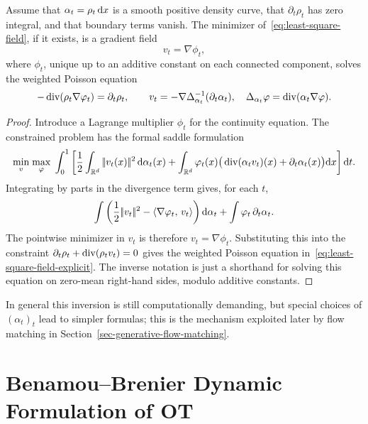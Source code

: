 \begin{prop}\label{prop-least-square-gradient-velocity}
	Assume that $\alpha_t=\rho_t\,\mathrm{d} x$ is a smooth positive density curve, that $\partial_t\rho_t$ has zero integral, and that boundary terms vanish. The minimizer of~\eqref{eq:least-square-field}, if it exists, is a gradient field
	\[
		v_t=\nabla\phi_t,
	\]
	where $\phi_t$, unique up to an additive constant on each connected component, solves the weighted Poisson equation
	\begin{equation}\label{eq:least-square-field-explicit}
		-\operatorname{div}(\rho_t\nabla\varphi_t)=\partial_t\rho_t,
		\qquad
		v_t=-\nabla\Delta_{\alpha_t}^{-1}(\partial_t\alpha_t),
		\quad
		\Delta_{\alpha_t}\varphi=\operatorname{div}(\alpha_t\nabla\varphi).
	\end{equation}
\end{prop}

\begin{proof}
	Introduce a Lagrange multiplier $\phi_t$ for the continuity equation. The constrained problem has the formal saddle formulation
	\[
		\underset{v}{\min}\;\underset{\varphi}{\max}\;
		\int_0^1
		\left[
			\frac12\int_{\mathbb{R}^d}|\!| v_t(x) |\!|^2\,\mathrm{d}\alpha_t(x)
			+\int_{\mathbb{R}^d}\varphi_t(x)\big(\operatorname{div}(\alpha_t v_t)(x)+\partial_t\alpha_t(x)\big)\mathrm{d} x
		\right]\mathrm{d} t.
	\]
	Integrating by parts in the divergence term gives, for each $t$,
	\[
		\int \left(\frac12|\!| v_t |\!|^2-\langle \nabla\varphi_t,\,v_t\rangle\right)\mathrm{d}\alpha_t
		+
		\int \varphi_t\,\partial_t\alpha_t.
	\]
	The pointwise minimizer in $v_t$ is therefore $v_t=\nabla\phi_t$. Substituting this into the constraint $\partial_t\rho_t+\operatorname{div}(\rho_t v_t)=0$ gives the weighted Poisson equation in~\eqref{eq:least-square-field-explicit}. The inverse notation is just a shorthand for solving this equation on zero-mean right-hand sides, modulo additive constants.
\end{proof}

In general this inversion is still computationally demanding, but special choices of $(\alpha_t)_t$ lead to simpler formulas; this is the mechanism exploited later by flow matching in Section~\ref{sec-generative-flow-matching}.

\section{Benamou--Brenier Dynamic Formulation of OT}
\label{sec-benamou-brenier-dynamic}

